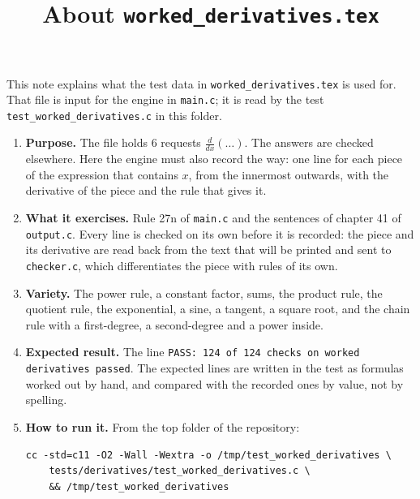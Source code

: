 \documentclass[11pt,a4paper]{article}
\title{About \texttt{worked\_derivatives.tex}}
\author{}
\date{}
\begin{document}
\maketitle
This note explains what the test data in \texttt{worked\_derivatives.tex} is used for. That file is input for the engine in \texttt{main.c}; it is read by the test \texttt{test\_worked\_derivatives.c} in this folder.

\begin{enumerate}
\item \textbf{Purpose.} The file holds 6 requests $\frac{d}{dx}(\ldots)$. The answers are checked elsewhere. Here the engine must also record the way: one line for each piece of the expression that contains $x$, from the innermost outwards, with the derivative of the piece and the rule that gives it.

\item \textbf{What it exercises.} Rule 27n of \texttt{main.c} and the sentences of chapter 41 of \texttt{output.c}. Every line is checked on its own before it is recorded: the piece and its derivative are read back from the text that will be printed and sent to \texttt{checker.c}, which differentiates the piece with rules of its own.

\item \textbf{Variety.} The power rule, a constant factor, sums, the product rule, the quotient rule, the exponential, a sine, a tangent, a square root, and the chain rule with a first-degree, a second-degree and a power inside.

\item \textbf{Expected result.} The line \texttt{PASS: 124 of 124 checks on worked derivatives passed}. The expected lines are written in the test as formulas worked out by hand, and compared with the recorded ones by value, not by spelling.

\item \textbf{How to run it.} From the top folder of the repository:
\begin{verbatim}
cc -std=c11 -O2 -Wall -Wextra -o /tmp/test_worked_derivatives \
    tests/derivatives/test_worked_derivatives.c \
    && /tmp/test_worked_derivatives
\end{verbatim}
\end{enumerate}
\end{document}
